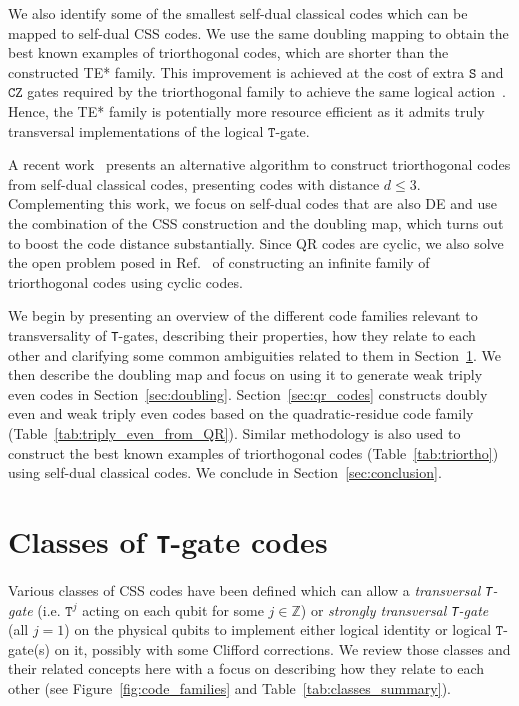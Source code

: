 \documentclass[journal]{IEEEtran}
\newcommand{\T}{\texttt{T}}
\begin{document}
We also identify some of the smallest self-dual classical codes which can be mapped to self-dual CSS codes. We use the same doubling mapping to obtain the best known examples of triorthogonal codes, which are shorter than the constructed TE* family. This improvement is achieved at the cost of extra $\texttt{S}$ and $\texttt{CZ}$ gates required by the triorthogonal family to achieve the same logical action~\cite{bravyi_magic-state_2012}. Hence, the TE* family is potentially more resource efficient as it admits truly transversal implementations of the logical $\texttt{T}$-gate. 

A recent work~\cite{shi_triorthogonal_2024} presents an alternative algorithm to construct triorthogonal codes from self-dual classical codes, presenting codes with distance $d \leq 3$. 
Complementing this work, we focus on self-dual codes that are also DE and use the combination of the CSS construction and the doubling map, which turns out to boost the code distance substantially. Since QR codes are cyclic, we also solve the open problem posed in Ref.~\cite{shi_triorthogonal_2024} of constructing an infinite family of triorthogonal codes using cyclic codes.

We begin by presenting an overview of the different code families relevant to transversality of \T-gates, describing their properties, how they relate to each other and clarifying some common ambiguities related to them in Section~\ref{sec:overview}. We then describe the doubling map and focus on using it to generate weak triply even codes in Section~\ref{sec:doubling}. Section~\ref{sec:qr_codes} constructs doubly even and weak triply even codes based on the quadratic-residue code family (Table~\ref{tab:triply_even_from_QR}). Similar methodology is also used to  construct the best known examples of triorthogonal codes (Table~\ref{tab:triortho}) using self-dual classical codes. We conclude in Section~\ref{sec:conclusion}.


\section{Classes of \T-gate codes}\label{sec:overview}
Various classes of CSS codes have been defined which can allow a \textit{transversal \T-gate} (i.e. $\texttt{T}^j$ acting on each qubit for some $j\in \mathbb{Z}$) or \textit{strongly transversal \T-gate} (all \(j=1\)) on the physical qubits to implement either logical identity or logical $\texttt{T}$-gate(s) on it, possibly with some Clifford corrections. We review those classes and their related concepts here with a focus on describing how they relate to each other (see Figure~\ref{fig:code_families} and Table~\ref{tab:classes_summary}). 
\end{document}

